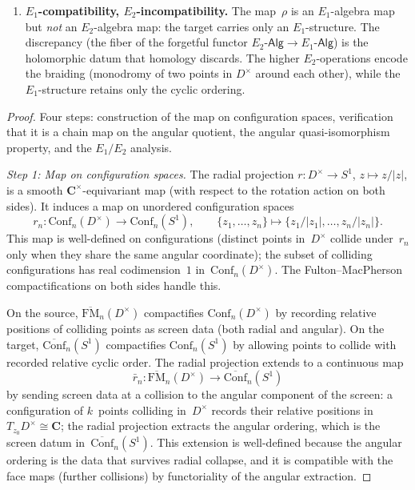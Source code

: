 \begin{proposition}
\begin{enumerate}[label=\textup{(\roman*)}]
\item \textbf{$E_1$-compatibility, $E_2$-incompatibility.}
 The map~$\rho$ is an $E_1$-algebra map but \emph{not}
 an $E_2$-algebra map: the target carries only an
 $E_1$-structure.
 The discrepancy (the fiber of the forgetful functor
 $E_2\text{-}\mathsf{Alg}\to E_1\text{-}\mathsf{Alg}$) is
 the holomorphic datum that homology discards.
 The higher $E_2$-operations encode the braiding
 (monodromy of two points in $D^\times$ around each
 other), while the $E_1$-structure retains only the
 cyclic ordering.
\end{enumerate}
\end{proposition}

\begin{proof}
Four steps: construction of the map on configuration spaces,
verification that it is a chain map on the angular quotient, the
angular quasi-isomorphism property, and the $E_1/E_2$ analysis.

\medskip
\noindent\textit{Step 1: Map on configuration spaces.}
The radial projection $r\colon D^\times\to S^1$,
$z\mapsto z/|z|$, is a smooth $\mathbf{C}^\times$-equivariant
map (with respect to the rotation action on both sides).
It induces a map on unordered configuration spaces
\begin{equation}\label{eq:config-retract}
 r_n\colon \mathrm{Conf}_n(D^\times)
 \longrightarrow \mathrm{Conf}_n(S^1),
 \qquad
 \{z_1,\dots,z_n\}\longmapsto
 \bigl\{z_1/|z_1|,\dots,z_n/|z_n|\bigr\}.
\end{equation}
This map is well-defined on configurations (distinct
points in~$D^\times$ collide under~$r_n$ only when
they share the same angular coordinate); the
subset of colliding configurations has real
codimension~$1$ in~$\mathrm{Conf}_n(D^\times)$.
The Fulton--MacPherson compactifications on both sides handle this.

On the source, $\overline{\mathrm{FM}}_n(D^\times)$
compactifies $\mathrm{Conf}_n(D^\times)$ by recording
relative positions of colliding points as
screen data (both radial and angular).
On the target, $\overline{\mathrm{Conf}}_n(S^1)$
compactifies $\mathrm{Conf}_n(S^1)$ by allowing
points to collide with recorded relative cyclic order.
The radial projection extends to a continuous map
\begin{equation}\label{eq:FM-retract}
 \bar r_n\colon
 \overline{\mathrm{FM}}_n(D^\times)
 \longrightarrow
 \overline{\mathrm{Conf}}_n(S^1)
\end{equation}
by sending screen data at a collision to the angular
component of the screen: a configuration of $k$~points
colliding in~$D^\times$ records their relative positions
in~$T_{z_0}D^\times\cong\mathbf{C}$; the radial
projection extracts the angular ordering, which is
the screen datum in~$\overline{\mathrm{Conf}}_n(S^1)$.
This extension is well-defined because the angular
ordering is the data that survives radial collapse,
and it is compatible with the face maps (further
collisions) by functoriality of the angular extraction.


\end{proof}
